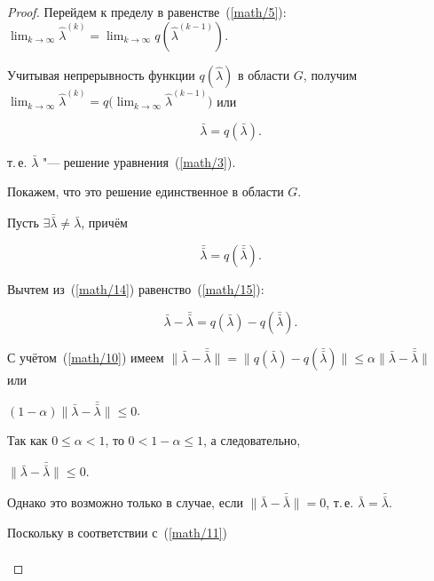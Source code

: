 \begin{proof}
Перейдем к пределу в равенстве~(\ref{math/5}): $\lim_{k\to\infty}\hat{\lambda}^{( k ) }=\lim_{k\to\infty} q( \hat{\lambda}^{( k-1 ) } ) $.

    Учитывая непрерывность функции  $q( \hat{\lambda} ) $ в области $G$,  получим $\lim_{k\to\infty}\hat{\lambda}^{( k ) }=q\bigl( \lim_{k\to\infty} \hat{\lambda}^{( k-1 ) } \bigr) $  или

    \begin{equation}

        \label{math/14}

        \bar{\lambda}=q( \bar{\lambda} ) .

    \end{equation}

    т.\,е. $\bar{\lambda}$ "--- решение уравнения~(\ref{math/3}).



Покажем, что    это решение единственное в области $G$.

Пусть  $\exists\bar{\bar{\lambda}}\neq\bar{\lambda}$, причём 

    \begin{equation}

        \label{math/15}

        \bar{\bar{\lambda}}=q(  \bar{\bar{\lambda}} ) .

    \end{equation}

Вычтем из~(\ref{math/14}) равенство~(\ref{math/15}):

$$\bar{\lambda}-\bar{\bar{\lambda}}=q( \bar{\lambda} ) -q( \bar{\bar{\lambda}} ) .$$

С учётом~(\ref{math/10}) имеем $\bigl\|\bar{\lambda}-\bar{\bar{\lambda}}\bigr\|=\bigl\|q( \bar{\lambda} ) -q(  \bar{\bar{\lambda}} ) \bigr\|\leq\alpha\bigl\|\bar{\lambda}-\bar{\bar{\lambda}}\bigr\|$  или

$( 1-\alpha ) \bigl \|\bar{\lambda}-\bar{\bar{\lambda}}\bigr\|\leq 0$. 

Так как $0\leq\alpha<1$,  то  $0<1-\alpha\leq1$,  а следовательно,

$\bigl\|\bar{\lambda}-\bar{\bar{\lambda}}\bigr\|\leq 0$. 

Однако это возможно только в случае,  если  $\bigl\|\bar{\lambda}-\bar{\bar{\lambda}}\bigr\|= 0$,  т.\,е.  $\bar{\lambda}=\bar{\bar{\lambda}}$.



Поскольку в соответствии с~(\ref{math/11})

\begin{gather*}


\end{gather*}
\end{proof}
